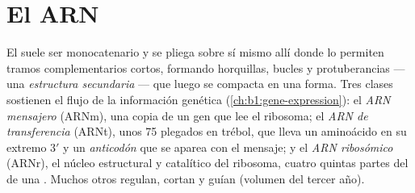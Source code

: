 \section{El ARN}

\begin{definition}\label{def:b1:nucleic-acids:rnas}
El  suele ser monocatenario y se pliega sobre sí mismo allí donde lo
permiten tramos complementarios cortos, formando horquillas, bucles y
protuberancias --- una \emph{estructura secundaria} --- que luego se
compacta en una forma. Tres clases sostienen el flujo de la información
genética (\cref{ch:b1:gene-expression}): el \emph{ARN
mensajero} (ARNm), una copia de un gen que lee el
ribosoma; el \emph{ARN de transferencia}
(ARNt), unos \qty{75}{}  plegados en trébol, que lleva un
aminoácido en su extremo $3'$ y un \emph{anticodón} que se aparea con el
mensaje; y el \emph{ARN ribosómico} (ARNr), el núcleo
estructural y catalítico del ribosoma, cuatro quintas partes del  de una
. Muchos otros  regulan, cortan y guían (volumen del tercer año).
\end{definition}

